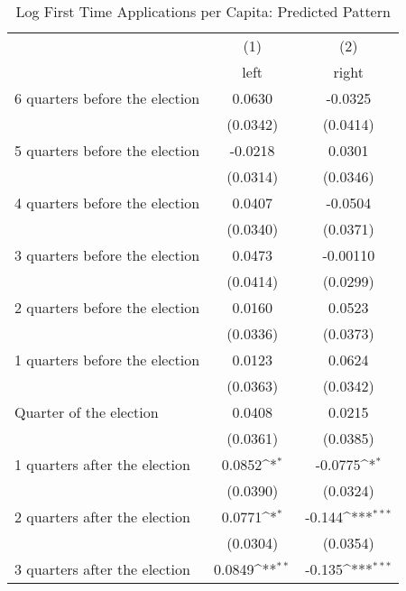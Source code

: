 \begin{table}[htbp]\centering
\def\sym#1{\ifmmode^{#1}\else\(^{#1}\)\fi}
\caption{Log First Time Applications per Capita: Predicted Pattern}
\begin{tabular}{l*{2}{c}}
\hline\hline
                    &\multicolumn{1}{c}{(1)}&\multicolumn{1}{c}{(2)}\\
                    &\multicolumn{1}{c}{left}&\multicolumn{1}{c}{right}\\
\hline
 6 quarters before the election&      0.0630         &     -0.0325         \\
                    &    (0.0342)         &    (0.0414)         \\
[1em]
 5 quarters before the election&     -0.0218         &      0.0301         \\
                    &    (0.0314)         &    (0.0346)         \\
[1em]
 4 quarters before the election&      0.0407         &     -0.0504         \\
                    &    (0.0340)         &    (0.0371)         \\
[1em]
 3 quarters before the election&      0.0473         &    -0.00110         \\
                    &    (0.0414)         &    (0.0299)         \\
[1em]
 2 quarters before the election&      0.0160         &      0.0523         \\
                    &    (0.0336)         &    (0.0373)         \\
[1em]
 1 quarters before the election&      0.0123         &      0.0624         \\
                    &    (0.0363)         &    (0.0342)         \\
[1em]
Quarter of the election&      0.0408         &      0.0215         \\
                    &    (0.0361)         &    (0.0385)         \\
[1em]
 1 quarters after the election&      0.0852\sym{*}  &     -0.0775\sym{*}  \\
                    &    (0.0390)         &    (0.0324)         \\
[1em]
 2 quarters after the election&      0.0771\sym{*}  &      -0.144\sym{***}\\
                    &    (0.0304)         &    (0.0354)         \\
[1em]
 3 quarters after the election&      0.0849\sym{**} &      -0.135\sym{***}\\

\end{tabular}
\end{table}

